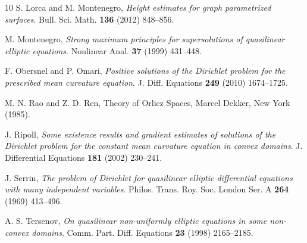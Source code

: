 \documentclass[11pt,leqno]{amsart}
\begin{document}
\begin{thebibliography}{10}
  S. Lorca and M. Montenegro,  {\em Height estimates for graph parametrized surfaces}. Bull. Sci. Math. \textbf{136} (2012) 848--856.

 M. Montenegro, {\em Strong maximum principles for supersolutions of quasilinear elliptic equations}. Nonlinear Anal. \textbf{37} (1999) 431--448.


 F. Obersnel and P. Omari, {\em Positive solutions of the Dirichlet problem for the prescribed mean curvature equation}. J. Diff. Equations \textbf{249} (2010) 1674--1725.

 M. N. Rao and Z. D. Ren, Theory of Orlicz Spaces, Marcel Dekker, New York (1985).

 J. Ripoll,  {\em Some existence results and gradient estimates of solutions of the Dirichlet problem for the constant mean curvature equation in convex domains}. J. Differential
Equations \textbf{181} (2002) 230--241.

  J. Serrin,  {\em The problem of Dirichlet for quasilinear elliptic differential equations with many independent variables}. Philos. Trans. Roy. Soc. London Ser. A \textbf{264} (1969) 413--496.

 A. S. Tersenov,  {\em On quasilinear non-uniformly elliptic equations in some non-convex domains}. Comm. Part. Diff. Equations \textbf{23} (1998) 2165--2185.


	
\end{thebibliography}
\end{document}
